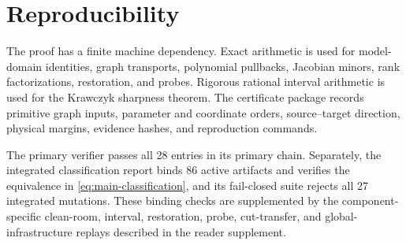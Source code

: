 \section{Reproducibility}\label{sec:reproducibility}

The proof has a finite machine dependency.  Exact arithmetic is used for
model-domain identities, graph transports, polynomial pullbacks, Jacobian
minors, rank factorizations, restoration, and probes.  Rigorous rational
interval arithmetic is used for the Krawczyk sharpness theorem.  The
certificate package records primitive graph inputs, parameter and coordinate
orders, source--target direction, physical margins, evidence hashes, and
reproduction commands.

The primary verifier passes all 28 entries in its primary chain.  Separately,
the integrated classification report binds 86 active artifacts and verifies the
equivalence in \cref{eq:main-classification}, and its fail-closed suite rejects
all 27 integrated mutations.  These binding checks are supplemented by the
component-specific clean-room, interval, restoration, probe, cut-transfer,
and global-infrastructure replays described in the reader supplement.

